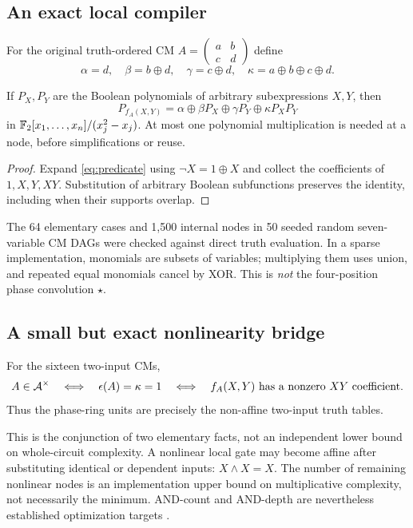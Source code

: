 \subsection{An exact local compiler}
For the original truth-ordered CM $A=\left(\begin{smallmatrix}a&b\\c&d\end{smallmatrix}\right)$ define
\begin{equation}\label{eq:localcoeff}
 \alpha=d,\quad\beta=b\oplus d,\quad\gamma=c\oplus d,\quad
 \kappa=a\oplus b\oplus c\oplus d.
\end{equation}
\begin{theorem}\label{thm:local}
If $P_X,P_Y$ are the Boolean polynomials of arbitrary subexpressions $X,Y$, then
\begin{equation}\label{eq:compiler}
 P_{f_A(X,Y)}=\alpha\oplus\beta P_X\oplus\gamma P_Y\oplus\kappa P_XP_Y
\end{equation}
in $\mathbb F_2[x_1,\ldots,x_n]/(x_j^2-x_j)$. At most one polynomial multiplication is needed at a node, before simplifications or reuse.
\end{theorem}
\begin{proof}
Expand \cref{eq:predicate} using $\neg X=1\oplus X$ and collect the coefficients of $1,X,Y,XY$. Substitution of arbitrary Boolean subfunctions preserves the identity, including when their supports overlap.
\end{proof}
The 64 elementary cases and 1,500 internal nodes in 50 seeded random seven-variable CM DAGs were checked against direct truth evaluation. In a sparse implementation, monomials are subsets of variables; multiplying them uses union, and repeated equal monomials cancel by XOR. This is \emph{not} the four-position phase convolution $\star$.

\subsection{A small but exact nonlinearity bridge}
\begin{corollary}\label{cor:nonlinear}
For the sixteen two-input CMs,
\begin{equation}
 A\in\mathcal A^\times\quad\Longleftrightarrow\quad
 \epsilon(A)=\kappa=1\quad\Longleftrightarrow\quad
 f_A(X,Y)\text{ has a nonzero }XY\text{ coefficient}.
\end{equation}
Thus the phase-ring units are precisely the non-affine two-input truth tables.
\end{corollary}
This is the conjunction of two elementary facts, not an independent lower bound on whole-circuit complexity. A nonlinear local gate may become affine after substituting identical or dependent inputs: $X\land X=X$. The number of remaining nonlinear nodes is an implementation upper bound on multiplicative complexity, not necessarily the minimum. AND-count and AND-depth are nevertheless established optimization targets \cite{nist,xag}.

